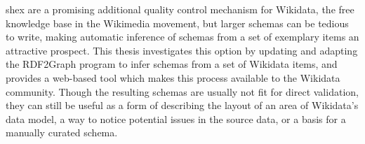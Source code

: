 
\Abstract
\acrlong{shex} are a promising additional quality control mechanism for \gls{Wikidata},
the free knowledge base in the \gls{Wikimedia} movement,
but larger \glspl{schema} can be tedious to write,
making automatic inference of \glspl{schema} from a set of exemplary \glspl{item} an attractive prospect.
This thesis investigates %
this option by updating and adapting the \gls{RDF2Graph} program to infer \glspl{schema} from a set of \gls{Wikidata} \glspl{item},
and provides a web-based tool which makes this process available to the \gls{Wikidata} community.
Though the resulting \glspl{schema} are usually not fit for direct validation,
they can still be useful as a form of describing the layout of an area of \gls{Wikidata}’s data model,
a way to notice potential issues in the source data,
or a basis for a manually curated \gls{schema}.
